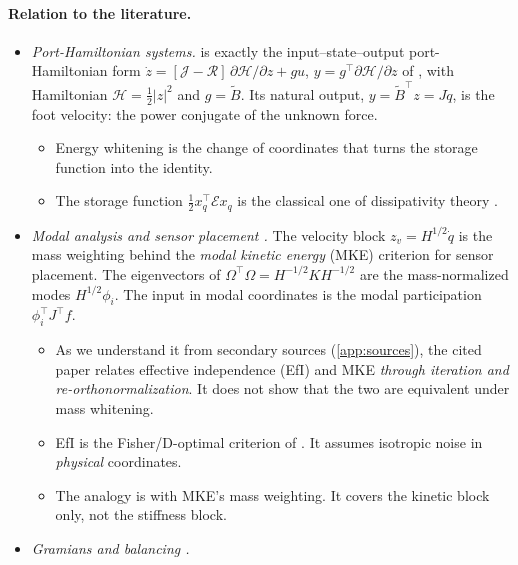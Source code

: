 \documentclass[11pt]{article}
\theoremstyle{definition}
\theoremstyle{remark}
\newcommand{\Em}{\mathcal{E}}         %
\newcommand{\Jt}{\mathcal{J}}
\newcommand{\Rt}{\mathcal{R}}
\begin{document}
\paragraph{Relation to the literature.}
\begin{itemize}
  \item \emph{Port-Hamiltonian systems.}  is exactly the input--state--output
        port-Hamiltonian form $\dot z=[\Jt-\Rt]\,\partial\mathcal H/\partial z+gu$,
        $y=g^\top\partial\mathcal H/\partial z$ of \citet[Eq.~(4.10)]{vanderschaft2014port},
        with Hamiltonian $\mathcal H=\frac12|z|^2$ and $g=\tilde B$. Its natural output,
        $y=\tilde B^\top z=J\dot q$, is the foot velocity: the power conjugate of the
        unknown force.
        \begin{itemize}[nosep]
          \item Energy whitening is the change of coordinates that turns the storage
                function into the identity.
          \item The storage function $\frac12x_q^\top\Em x_q$ is the classical one of
                dissipativity theory \citep{willems1972dissipative}.
        \end{itemize}
  \item \emph{Modal analysis and sensor placement \citep{li2007connection}.} The velocity block
        $z_v=H^{1/2}\dot q$ is the mass weighting behind the \emph{modal kinetic energy}
        (MKE) criterion for sensor placement. The
        eigenvectors of $\Omega^\top\Omega=H^{-1/2}KH^{-1/2}$ are the mass-normalized modes
        $H^{1/2}\phi_i$. The input in modal coordinates is the modal participation
        $\phi_i^\top J^\top f$.
        \begin{itemize}[nosep]
          \item As we understand it from secondary sources (\cref{app:sources}), the
                cited paper relates effective independence (EfI) and MKE \emph{through
                iteration and re-orthonormalization}. It does not show that the two are
                equivalent under mass whitening.
          \item EfI is the Fisher/D-optimal criterion of \citet{kammer1991sensor}. It
                assumes isotropic noise in \emph{physical} coordinates.
          \item The analogy is with MKE's mass weighting. It covers the kinetic block
                only, not the stiffness block.
        \end{itemize}
  \item \emph{Gramians and balancing \citep{moore1981principal}.}

\end{itemize}
\end{document}
